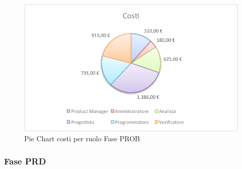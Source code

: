 				\begin{figure}[H]\centering
					\includegraphics[width=\textwidth]{PianoDiProgetto/Pics/ChartTotCostiFasePROB.pdf}
					\caption{Pie Chart costi per ruolo Fase PROB}
				\end{figure}
		\subsubsection{Fase PRD}
